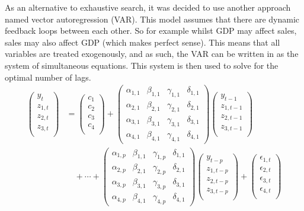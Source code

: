 \documentclass[11pt, a4paper]{article}
\begin{document}
As an alternative to exhaustive search, it was decided to use another approach named vector autoregression (VAR). This model assumes that there are dynamic feedback loops between each other. So for example whilst GDP may affect sales, sales may also affect GDP (which makes perfect sense). This means that all variables are treated exogenously, and as such, the VAR can be written in as the system of simultaneous equations. This system is then used to solve for the optimal number of lags. 
\begin{align}
\begin{pmatrix}
y_{t}\\
z_{1,t}\\
z_{2,t}\\
z_{3,t}\\
\end{pmatrix}
&=
\begin{pmatrix}
c_{1}\\
c_{2}\\
c_{3}\\
c_{4}\\
\end{pmatrix}
+
\begin{pmatrix}
\alpha_{1,1} & \beta_{1,1} & \gamma_{1,1} & \delta_{1,1}\\
\alpha_{2,1} & \beta_{2,1} & \gamma_{2,1} & \delta_{2,1}\\
\alpha_{3,1} & \beta_{3,1} & \gamma_{3,1} & \delta_{3,1}\\
\alpha_{4,1} & \beta_{4,1} & \gamma_{4,1} & \delta_{4,1}
\end{pmatrix}
\begin{pmatrix}
y_{t-1}\\
z_{1,t-1}\\
z_{2,t-1}\\
z_{3,t-1}\\
\end{pmatrix} \nonumber \\
&\quad + \cdots + \begin{pmatrix}
\alpha_{1,p} & \beta_{1,1} & \gamma_{1,p} & \delta_{1,1}\\
\alpha_{2,p} & \beta_{2,1} & \gamma_{2,p} & \delta_{2,1}\\
\alpha_{3,p} & \beta_{3,1} & \gamma_{3,p} & \delta_{3,1}\\
\alpha_{4,p} & \beta_{4,1} & \gamma_{4,p} & \delta_{4,1}
\end{pmatrix}
\begin{pmatrix}
y_{t-p}\\
z_{1,t-p}\\
z_{2,t-p}\\
z_{3,t-p}\\
\end{pmatrix} 
+
\begin{pmatrix}
\epsilon_{1,t}\\
\epsilon_{2,t}\\
\epsilon_{3,t}\\
\epsilon_{4,t}\\
\end{pmatrix}
\end{align}
\end{document}
